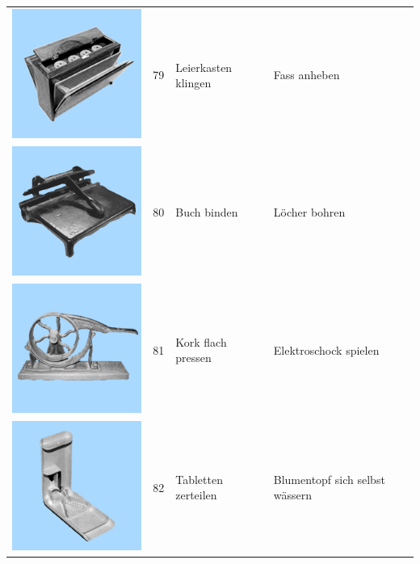 \documentclass[
  english,
  man,floatsintext]{apa7}
\begin{document}
\begin{center}
\begin{ThreePartTable}
\begin{longtable}{llll}
\includegraphics[valign=c, scale=0.19]{../materials/unfamiliar/79.png} & 79 & Leierkasten klingen & Fass anheben\\
\includegraphics[valign=c, scale=0.19]{../materials/unfamiliar/80.png} & 80 & Buch binden & Löcher bohren\\
\includegraphics[valign=c, scale=0.19]{../materials/unfamiliar/81.png} & 81 & Kork flach pressen & Elektroschock spielen\\
\includegraphics[valign=c, scale=0.19]{../materials/unfamiliar/82.png} & 82 & Tabletten zerteilen & Blumentopf sich selbst wässern\\

\end{longtable}
\end{ThreePartTable}
\end{center}
\end{document}
